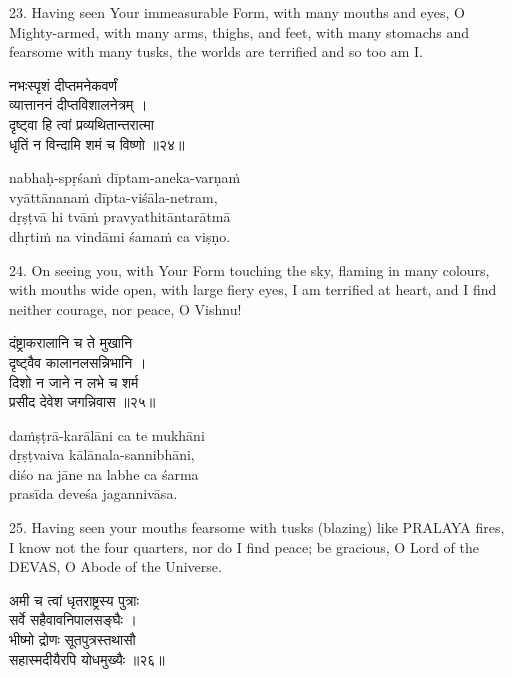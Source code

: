 23. Having seen Your immeasurable Form, with many mouths and eyes, O
Mighty-armed, with many arms, thighs, and feet, with many stomachs and fearsome
with many tusks, the worlds are terrified and so too am I.\@

\begin{gitaverse}
नभःस्पृशं दीप्तमनेकवर्णं \\
\tab व्यात्ताननं दीप्तविशालनेत्रम् । \\
दृष्ट्वा हि त्वां प्रव्यथितान्तरात्मा \\
\tab धृतिं न विन्दामि शमं च विष्णो ॥२४॥
\end{gitaverse}

\begin{transliteration}
nabhaḥ-spṛśaṁ dīptam-aneka-varṇaṁ \\
\tab vyāttānanaṁ dīpta-viśāla-netram, \\
dṛṣṭvā hi tvāṁ pravyathitāntarātmā \\
\tab dhṛtiṁ na vindāmi śamaṁ ca viṣṇo.
\end{transliteration}

24. On seeing you, with Your Form touching the sky, flaming in many colours,
with mouths wide open, with large fiery eyes, I am terrified at heart, and I
find neither courage, nor peace, O Vishnu!

\begin{gitaverse}
दंष्ट्राकरालानि च ते मुखानि \\
\tab दृष्ट्वैव कालानलसन्निभानि । \\
दिशो न जाने न लभे च शर्म \\
\tab प्रसीद देवेश जगन्निवास ॥२५॥
\end{gitaverse}

\begin{transliteration}
daṁṣṭrā-karālāni ca te mukhāni \\
\tab dṛṣṭvaiva kālānala-sannibhāni, \\
diśo na jāne na labhe ca śarma \\
\tab prasīda deveśa jagannivāsa.
\end{transliteration}

25. Having seen your mouths fearsome with tusks (blazing) like PRALAYA fires, I
know not the four quarters, nor do I find peace; be gracious, O Lord of the
DEVAS, O Abode of the Universe.

\begin{gitaverse}
अमी च त्वां धृतराष्ट्रस्य पुत्राः \\
\tab सर्वे सहैवावनिपालसङ्घैः । \\
भीष्मो द्रोणः सूतपुत्रस्तथासौ \\
\tab सहास्मदीयैरपि योधमुख्यैः ॥२६॥
\end{gitaverse}

